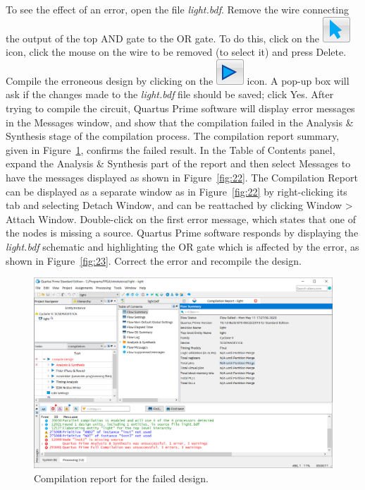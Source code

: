 \documentclass[11pt, twoside, pdftex]{article}
\begin{document}
To see the effect of an error, open the file {\it light.bdf}.
Remove the wire connecting the output of the top AND gate to the OR gate.
To do this, click on the \includegraphics[scale=0.45]{figures/icon4.png} icon,
click the mouse on the wire to be removed (to select it) and press Delete. 
Compile the erroneous design by clicking on the \includegraphics[scale=0.45]{figures/icon5.png} icon.
A pop-up box will ask if the changes made to the {\it light.bdf} file should be saved;
click {\sf Yes}. After trying to compile the circuit,
Quartus Prime software will display error messages in the Messages window, and 
show that the compilation failed in the {\sf Analysis \& Synthesis} stage of the compilation process.
The compilation report summary, given in Figure~\ref{fig:21}, 
confirms the failed result. In the Table of Contents panel, expand the {\sf Analysis \& Synthesis} part of the report
and then select {\sf Messages} to have the messages displayed as shown in Figure~\ref{fig:22}.
The Compilation Report can be displayed as a separate window as in Figure~\ref{fig:22} 
by right-clicking its tab and selecting {\sf Detach Window}, and can be reattached by clicking
{\sf Window > Attach Window}.
Double-click on the first error message, which states that one of the nodes
is missing a source.
Quartus Prime software responds by displaying the {\it light.bdf}
schematic and highlighting the OR gate which is affected by the error,
as shown in Figure~\ref{fig:23}.
Correct the error and recompile the design.

\begin{figure}[H]
   \begin{center}
      \includegraphics[scale=0.4]{figures/figure21.png}
   \caption{Compilation report for the failed design.} 
	 \label{fig:21}
	 \end{center}
\end{figure}
\end{document}
